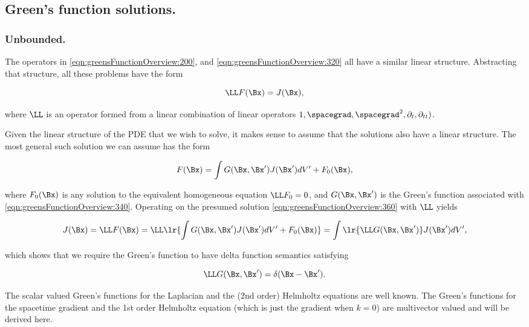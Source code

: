 
\subsection{Green's function solutions.}

\subsubsection{Unbounded.}

The operators in \cref{eqn:greensFunctionOverview:200}, and \cref{eqn:greensFunctionOverview:320} all have a similar linear structure.
Abstracting that structure, all these problems have the form

\begin{dmath}\label{eqn:greensFunctionOverview:340}
\LL F(\Bx) = J(\Bx),
\end{dmath}

where \( \LL \) is an operator formed from a linear combination of linear operators \( 1, \spacegrad, \spacegrad^2, \partial_t, \partial_{tt}) \).

Given the linear structure of the PDE that we wish to solve, it makes sense to assume that the solutions also have a linear structure.
The most general such solution we can assume has the form

\begin{dmath}\label{eqn:greensFunctionOverview:360}
F(\Bx) = \int G(\Bx, \Bx') J(\Bx') dV' + F_0(\Bx),
\end{dmath}

where \( F_0(\Bx) \) is any solution to the equivalent homogeneous equation \( \LL F_0 = 0 \), and \( G(\Bx, \Bx') \) is the Green's function associated with \cref{eqn:greensFunctionOverview:340}.
Operating on the presumed solution
\cref{eqn:greensFunctionOverview:360} with \( \LL \) yields

\begin{dmath}\label{eqn:greensFunctionOverview:380}
J(\Bx) = \LL F(\Bx) = \LL\lr{
\int G(\Bx, \Bx') J(\Bx') dV' + F_0(\Bx) }
=
\int \lr{ \LL G(\Bx, \Bx') } J(\Bx') dV',
\end{dmath}

which shows that we require the Green's function to have delta function semantics satisfying

\begin{dmath}\label{eqn:greensFunctionOverview:400}
\LL G(\Bx, \Bx') = \delta(\Bx - \Bx').
\end{dmath}

The scalar valued Green's functions for the Laplacian and the (2nd order) Helmholtz equations are well known.
The Green's functions for the spacetime gradient and the 1st order Helmholtz equation (which is just the gradient when \( k = 0 \)) are multivector valued and will be derived here.

